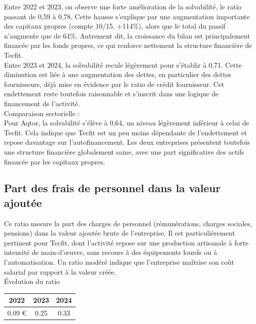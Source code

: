 Entre 2022 et 2023, on observe une forte amélioration de la solvabilité, le ratio passant de 0,59 à 0,78. Cette hausse s’explique par une augmentation importante des capitaux propres (compte 10/15, +114\%), alors que le total du passif n’augmente que de 64\%. Autrement dit, la croissance du bilan est principalement financée par les fonds propres, ce qui renforce nettement la structure financière de Tecfit.\\
Entre 2023 et 2024, la solvabilité recule légèrement pour s’établir à 0,71. Cette diminution est liée à une augmentation des dettes, en particulier des dettes fournisseurs, déjà mise en évidence par le ratio de crédit fournisseur. Cet endettement reste toutefois raisonnable et s’inscrit dans une logique de financement de l’activité.\\
Comparaison sectorielle :\\
Pour Aqtor, la solvabilité s’élève à 0,64, un niveau légèrement inférieur à celui de Tecfit. Cela indique que Tecfit est un peu moins dépendante de l’endettement et repose davantage sur l’autofinancement. Les deux entreprises présentent toutefois une structure financière globalement saine, avec une part significative des actifs financée par les capitaux propres.

\subsection{Part des frais de personnel dans la valeur ajoutée}
Ce ratio mesure la part des charges de personnel (rémunérations, charges sociales, pensions) dans la valeur ajoutée brute de l’entreprise. Il est particulièrement pertinent pour Tecfit, dont l’activité repose sur une production artisanale à forte intensité de main-d’œuvre, sans recours à des équipements lourds ou à l’automatisation. Un ratio modéré indique que l’entreprise maîtrise son coût salarial par rapport à la valeur créée.\\
Évolution du ratio\\
\begin{table}[h]
\centering
\begin{tabular}{c|c|c}
\textbf{2022} & \textbf{2023} & \textbf{2024} \\
\hline
0.09 € & 0.25 & 0.33 \\
\end{tabular}
\end{table}

